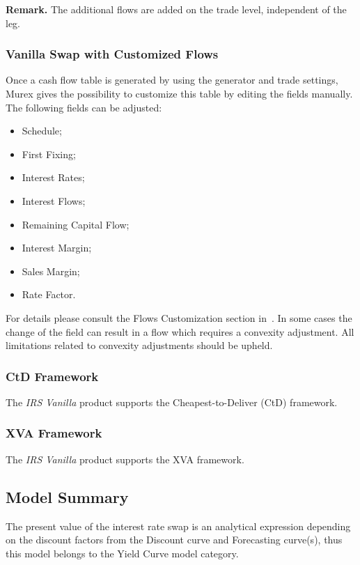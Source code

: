\documentclass[]{pmv_report} %
\begin{document}
\textbf{Remark.} The additional flows are added on the trade level, independent of the leg.

\subsubsection{Vanilla Swap with Customized Flows}
Once a cash flow table is generated by using the generator and trade settings, Murex gives the possibility to customize this table by editing the fields manually.
The following fields can be adjusted:
\begin{itemize}
  \item Schedule;
  \item First Fixing;
  \item Interest Rates;
  \item Interest Flows;
  \item Remaining Capital Flow;
  \item Interest Margin;
  \item Sales Margin;
  \item Rate Factor.
\end{itemize}
For details please consult the Flows Customization section in~\cite{Mx.GenericFunctionalities}.
In some cases the change of the field can result in a flow which requires a convexity adjustment.
All limitations related to convexity adjustments should be upheld.

\subsubsection{CtD Framework}
\label{sec:CtD}
The \textit{IRS Vanilla} product supports the Cheapest-to-Deliver (CtD) framework. 

\subsubsection{XVA Framework}
\label{sec:XVA}
The \textit{IRS Vanilla} product supports the XVA framework. 

\subsection{Model Summary}
The present value of the interest rate swap is an analytical expression depending on the discount factors from the Discount curve and Forecasting curve(s), thus this model belongs to the Yield Curve model category.
\end{document}
